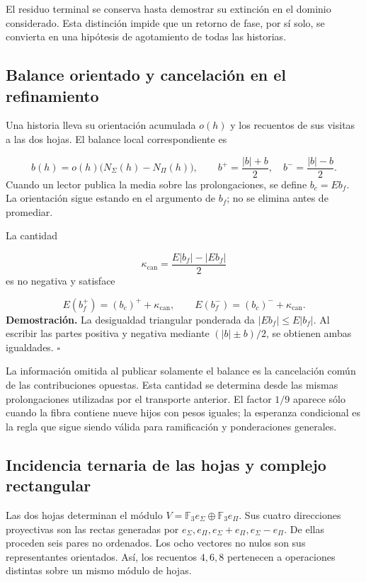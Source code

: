 El residuo terminal se conserva hasta demostrar su extinción en el dominio considerado. Esta distinción impide que un retorno de fase, por sí solo, se convierta en una hipótesis de agotamiento de todas las historias.

\subsection{Balance orientado y cancelación en el refinamiento}
Una historia lleva su orientación acumulada \(o(h)\) y los recuentos de sus visitas a las dos hojas. El balance local correspondiente es

\[
b(h)=o(h)\bigl(N_\Sigma(h)-N_\Pi(h)\bigr),
\qquad
b^+=\frac{|b|+b}{2},\quad b^-=\frac{|b|-b}{2}.
\]
Cuando un lector publica la media sobre las prolongaciones, se define \(b_c=Eb_f\). La orientación sigue estando en el argumento de \(b_f\); no se elimina antes de promediar.

La cantidad

\[
\kappa_{\mathrm{can}}=
\frac{E|b_f|-|Eb_f|}{2}
\]
es no negativa y satisface

\[
E(b_f^+)=(b_c)^++\kappa_{\mathrm{can}},
\qquad
E(b_f^-)=(b_c)^-+\kappa_{\mathrm{can}}.
\]
\textbf{Demostración.} La desigualdad triangular ponderada da \(|Eb_f|\leq E|b_f|\). Al escribir las partes positiva y negativa mediante \((|b|\pm b)/2\), se obtienen ambas igualdades. \hfill\(\square\)

La información omitida al publicar solamente el balance es la cancelación común de las contribuciones opuestas. Esta cantidad se determina desde las mismas prolongaciones utilizadas por el transporte anterior. El factor \(1/9\) aparece sólo cuando la fibra contiene nueve hijos con pesos iguales; la esperanza condicional es la regla que sigue siendo válida para ramificación y ponderaciones generales.

\subsection{Incidencia ternaria de las hojas y complejo rectangular}
Las dos hojas determinan el módulo \(V=\mathbb F_3e_\Sigma\oplus\mathbb F_3e_\Pi\). Sus cuatro direcciones proyectivas son las rectas generadas por \(e_\Sigma,e_\Pi,e_\Sigma+e_\Pi,e_\Sigma-e_\Pi\). De ellas proceden seis pares no ordenados. Los ocho vectores no nulos son sus representantes orientados. Así, los recuentos \(4,6,8\) pertenecen a operaciones distintas sobre un mismo módulo de hojas.

